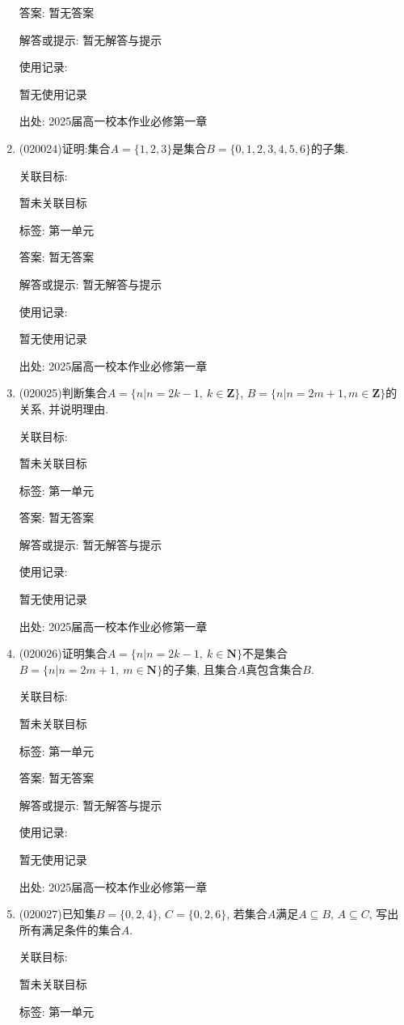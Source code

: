 \documentclass[10pt,a4paper]{article}
\begin{document}
\begin{enumerate}[1.]
答案: 暂无答案

解答或提示: 暂无解答与提示

使用记录:

暂无使用记录


出处: 2025届高一校本作业必修第一章
\item { (020024)}证明:集合$A=\{1,2,3\}$是集合$B=\{0,1,2,3,4,5,6\}$的子集.


关联目标:

暂未关联目标



标签: 第一单元

答案: 暂无答案

解答或提示: 暂无解答与提示

使用记录:

暂无使用记录


出处: 2025届高一校本作业必修第一章
\item { (020025)}判断集合$A=\{n|n=2k-1,\ k\in \mathbf{Z}\}$, $B=\{n|n=2m+1,m\in \mathbf{Z}\}$的关系, 并说明理由.


关联目标:

暂未关联目标



标签: 第一单元

答案: 暂无答案

解答或提示: 暂无解答与提示

使用记录:

暂无使用记录


出处: 2025届高一校本作业必修第一章
\item { (020026)}证明集合$A=\{n|n=2k-1,\ k\in \mathbf{N}\}$不是集合$B=\{n|n=2m+1, \ m\in \mathbf{N}\}$的子集, 且集合$A$真包含集合$B$.


关联目标:

暂未关联目标



标签: 第一单元

答案: 暂无答案

解答或提示: 暂无解答与提示

使用记录:

暂无使用记录


出处: 2025届高一校本作业必修第一章
\item { (020027)}已知集$B=\{0, 2, 4\}$, $C=\{0, 2, 6\}$, 若集合$A$满足$A\subseteq B$, $A\subseteq C$, 写出所有满足条件的集合$A$.


关联目标:

暂未关联目标



标签: 第一单元


\end{enumerate}
\end{document}
